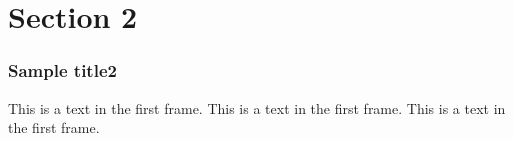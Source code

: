 \documentclass{beamer}
\begin{document}
\section{Section 2}
\begin{frame}
\frametitle{Sample title2}
This is a text in the first frame. This is a text in the first frame. This is a text in the first frame.
\end{frame}

  
\end{document}

